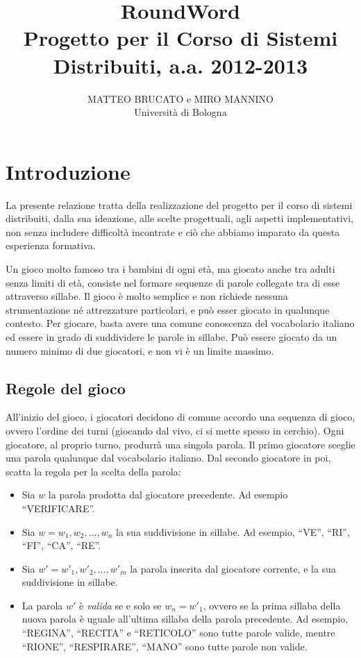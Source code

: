 \documentclass[10.5pt]{article}
\title{RoundWord\\
\large{Progetto per il Corso di Sistemi Distribuiti, a.a. 2012-2013}}
\author{MATTEO BRUCATO e MIRO MANNINO\\Università di Bologna}
\begin{document}

\maketitle

\begin{abstract}

\end{abstract}


\tableofcontents

\section{Introduzione}

La presente relazione tratta della realizzazione del progetto per il corso di sistemi distribuiti, dalla sua ideazione, alle scelte progettuali, agli aspetti implementativi, non senza includere difficoltà incontrate e ciò che abbiamo imparato da questa esperienza formativa.

Un gioco molto famoso tra i bambini di ogni età, ma giocato anche tra adulti senza limiti di età, consiste nel formare sequenze di parole collegate tra di esse attraverso sillabe. Il gioco è molto semplice e non richiede nessuna strumentazione né attrezzature particolari, e può esser giocato in qualunque contesto. Per giocare, basta avere una comune conoscenza del vocabolario italiano ed essere in grado di suddividere le parole in sillabe. Può essere giocato da un numero minimo di due giocatori, e non vi è un limite massimo.

\subsection{Regole del gioco}
All'inizio del gioco, i giocatori decidono di comune accordo una sequenza di gioco, ovvero l'ordine dei turni (giocando dal vivo, ci si mette spesso in cerchio). Ogni giocatore, al proprio turno, produrrà una singola parola. Il primo giocatore sceglie una parola qualunque dal vocabolario italiano. Dal secondo giocatore in poi, scatta la regola per la scelta della parola:
\begin{itemize}
\item Sia $w$ la parola prodotta dal giocatore precedente. Ad esempio ``VERIFICARE''.
\item Sia $w=w_1, w_2, \dots, w_n$ la sua suddivisione in sillabe. Ad esempio, ``VE'', ``RI'', ``FI'', ``CA'', ``RE''.
\item Sia $w'=w'_1, w'_2, \dots, w'_m$ la parola inserita dal giocatore corrente, e la sua suddivisione in sillabe.
\item La parola $w'$ è \emph{valida} se e solo se $w_n = w'_1$, ovvero se la prima sillaba della nuova parola è uguale all'ultima sillaba della parola precedente. Ad esempio, ``REGINA'', ``RECITA'' e ``RETICOLO'' sono tutte parole valide, mentre ``RIONE'', ``RESPIRARE'', ``MANO'' sono tutte parole non valide.
\end{itemize}
\end{document}
